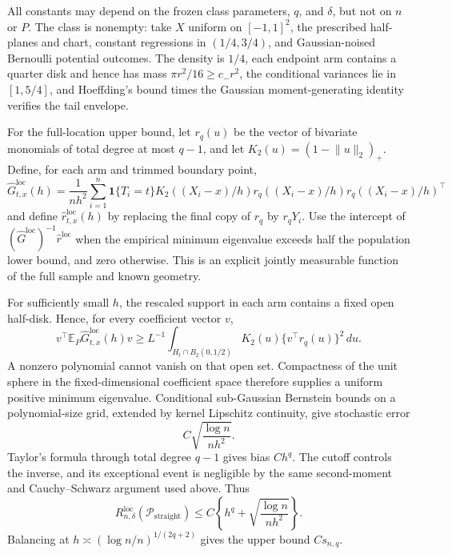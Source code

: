 All constants may depend on the frozen class parameters, \(q\), and \(\delta\), but not on \(n\) or \(P\).  The class is nonempty: take \(X\) uniform on \([-1,1]^2\), the prescribed half-planes and chart, constant regressions in \((1/4,3/4)\), and Gaussian-noised Bernoulli potential outcomes.  The density is \(1/4\), each endpoint arm contains a quarter disk and hence has mass \(\pi r^2/16\geq c_-r^2\), the conditional variances lie in \([1,5/4]\), and Hoeffding's bound times the Gaussian moment-generating identity verifies the tail envelope.

For the full-location upper bound, let \(r_q(u)\) be the vector of bivariate monomials of total degree at most \(q-1\), and let \(K_2(u)=(1-\lVert u\rVert_2)_+\).  Define, for each arm and trimmed boundary point,
\[
 \widehat G^{\mathrm{loc}}_{t,x}(h)=\frac1{nh^2}\sum_{i=1}^n
 \mathbf1\{T_i=t\}K_2((X_i-x)/h)
 r_q((X_i-x)/h)r_q((X_i-x)/h)^\top
\]
and define \(\widehat r^{\mathrm{loc}}_{t,x}(h)\) by replacing the final copy of \(r_q\) by \(r_qY_i\).  Use the intercept of \((\widehat G^{\mathrm{loc}})^{-1}\widehat r^{\mathrm{loc}}\) when the empirical minimum eigenvalue exceeds half the population lower bound, and zero otherwise.  This is an explicit jointly measurable function of the full sample and known geometry.

For sufficiently small \(h\), the rescaled support in each arm contains a fixed open half-disk.  Hence, for every coefficient vector \(v\),
\[
 v^\top\mathbb E_P\widehat G^{\mathrm{loc}}_{t,x}(h)v
 \geq L^{-1}\int_{H_t\cap B_2(0,1/2)}K_2(u)
 \{v^\top r_q(u)\}^2\,du.
\]
A nonzero polynomial cannot vanish on that open set.  Compactness of the unit sphere in the fixed-dimensional coefficient space therefore supplies a uniform positive minimum eigenvalue.  Conditional sub-Gaussian Bernstein bounds on a polynomial-size grid, extended by kernel Lipschitz continuity, give stochastic error
\[
 C\sqrt{\frac{\log n}{nh^2}}.
\]
Taylor's formula through total degree \(q-1\) gives bias \(Ch^q\).  The cutoff controls the inverse, and its exceptional event is negligible by the same second-moment and Cauchy--Schwarz argument used above.  Thus
\[
 R_{n,\delta}^{\mathrm{loc}}(\mathcal P_{\mathrm{straight}})
 \leq C\left\{h^q+\sqrt{\frac{\log n}{nh^2}}\right\}.
\]
Balancing at \(h\asymp(\log n/n)^{1/(2q+2)}\) gives the upper bound \(Cs_{n,q}\).


